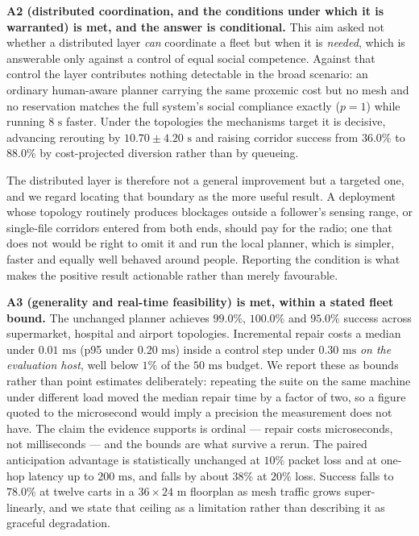 \documentclass[journal]{IEEEtran}
\begin{document}
\textbf{A2 (distributed coordination, and the conditions under which it is
warranted) is met, and the answer is conditional.} This aim asked not whether a
distributed layer \emph{can} coordinate a fleet but when it is \emph{needed}, which
is answerable only against a control of equal social competence. Against that
control the layer contributes nothing detectable in the broad scenario: an ordinary
human-aware planner carrying the same proxemic cost but no mesh and no reservation
matches the full system's social compliance exactly ($p = 1$) while running
$8\text{ s}$ faster. Under the topologies the mechanisms target it is decisive,
advancing rerouting by $10.70 \pm 4.20\text{ s}$ and raising corridor success from
$36.0\%$ to $88.0\%$ by cost-projected diversion rather than by queueing.

The distributed layer is therefore not a general improvement but a targeted one, and
we regard locating that boundary as the more useful result. A deployment whose
topology routinely produces blockages outside a follower's sensing range, or
single-file corridors entered from both ends, should pay for the radio; one that
does not would be right to omit it and run the local planner, which is simpler,
faster and equally well behaved around people. Reporting the condition is what makes
the positive result actionable rather than merely favourable.

\textbf{A3 (generality and real-time feasibility) is met, within a stated fleet
bound.} The unchanged planner achieves $99.0\%$, $100.0\%$ and $95.0\%$ success
across supermarket, hospital and airport topologies. Incremental repair costs a median
under $0.01\text{ ms}$ (p95 under $0.20\text{ ms}$) inside a control step under
$0.30\text{ ms}$ \emph{on the evaluation host}, well below $1\%$ of the
$50\text{ ms}$ budget. We report these as bounds rather than point estimates
deliberately: repeating the suite on the same machine under different load moved the
median repair time by a factor of two, so a figure quoted to the microsecond would
imply a precision the measurement does not have. The claim the evidence supports is
ordinal --- repair costs microseconds, not milliseconds --- and the bounds are what
survive a rerun. The paired anticipation advantage is statistically unchanged at $10\%$ packet loss and at one-hop latency up to $200\text{ ms}$, and falls by about $38\%$ at $20\%$ loss. Success falls to $78.0\%$ at twelve carts in a
$36 \times 24\text{ m}$ floorplan as mesh traffic grows super-linearly, and we state
that ceiling as a limitation rather than describing it as graceful degradation.
\end{document}
